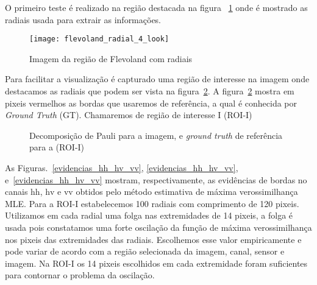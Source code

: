 O primeiro teste é realizado na região destacada na figura ~\ref{flevoland_4_look_radial} onde é mostrado as radiais usada para extrair as informações. 
\begin{figure}[hbt]
	\centering
	\texttt{[image: flevoland\_radial\_4\_look]}%
	\caption{Imagem da região de Flevoland com radiais}
\label{flevoland_4_look_radial}
\end{figure}
\clearpage
Para facilitar a visualização é capturado uma região de interesse na imagem onde destacamos as radiais que podem ser vista na figura~\ref{roi_gt}. A figura~\ref{roi_gt} mostra em pixeis vermelhos as bordas que usaremos de referência, a qual é conhecida por \textit{Ground Truth} (GT). Chamaremos de região de interesse I (ROI-I)  
\begin{figure}[hbt]
   \centering
    \caption{Decomposição de Pauli para a imagem, e \textit{ground truth} de referência para a (ROI-I)}
    \label{roi_gt}
\end{figure}

As Figuras.~\ref{evidencias_hh_hv_vv}, \ref{evidencias_hh_hv_vv}, e~\ref{evidencias_hh_hv_vv} mostram, respectivamente, as evidências de bordas no canais $\text{hh}$, $\text{hv}$ e $\text{vv}$ obtidos pelo método estimativa de máxima verossimilhança MLE. Para a ROI-I estabelecemos 100 radiais com comprimento de 120 pixeis. Utilizamos em cada radial uma folga nas extremidades de  14 pixeis, a folga é usada pois constatamos uma forte oscilação da função de máxima verossimilhança nos pixeis das extremidades das radiais. Escolhemos esse valor empiricamente e pode variar de acordo com a região selecionada da imagem, canal, sensor e imagem. Na ROI-I os 14 pixeis escolhidos em cada extremidade foram suficientes para contornar o problema da oscilação.

